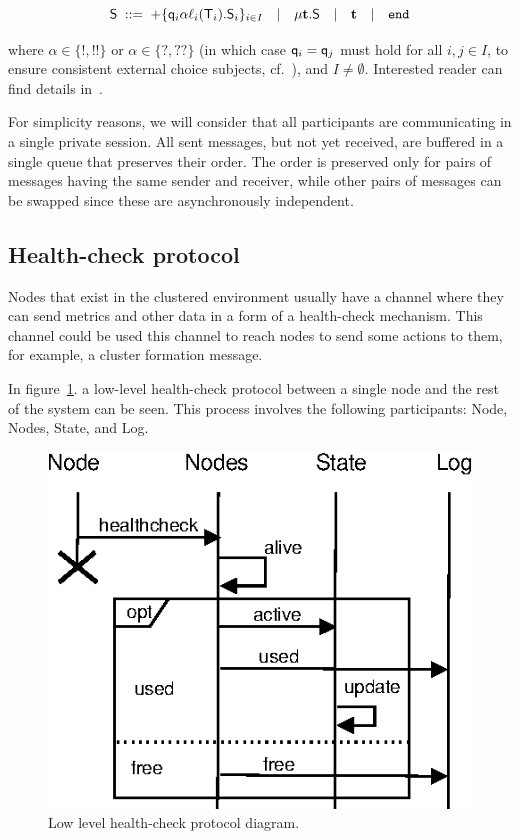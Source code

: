 \begin{enumerate}[start=1,label={(\bfseries \arabic*)}]
	\begin{equation}
	{\mathsf S} \; ::= \; 
	{+}\{{\sf q}_i\alpha\ell_i({\mathsf T}_i).{\mathsf S}_i\}_{i\in I}  \quad | \quad 
	\mu \textbf{t}.{\mathsf S} \quad | \quad 
	\textbf{t} \quad | \quad
	\mathtt{end}
	\end{equation}
	
	\noindent
	where $\alpha\in\{{!}, {!!}\}$ or  $\alpha\in\{{?}, {??}\}$ (in which case ${\sf q}_i={\sf q}_j$ must hold for all $i,j \in I$, to ensure consistent external choice subjects, cf.~\cite[Page 6.]{HuY17}), and $I\not=\emptyset$.
	Interested reader can find details in~\cite{HuY17}.
\end{enumerate}

\noindent
For simplicity reasons, we will consider that all participants are communicating in a single private session. All sent messages, but not yet received, are buffered in a single queue that preserves their order. The order is preserved only for pairs of messages having the same sender and receiver, while other pairs of messages can be swapped since these are asynchronously independent.
%
%
\subsection{Health-check protocol}\label{sec:health_check_protocol}
%
Nodes that exist in the clustered environment usually have a channel where they can send metrics and other data in a form of a health-check mechanism. This channel could be used this channel to reach nodes to send some actions to them, for example, a cluster formation message. 

In figure~\ref{fig:fig6}. a low-level health-check protocol between a single node and the rest of the system can be seen. This process involves the following participants: Node, Nodes, State, and Log.

\begin{figure}[H]
	\begin{center}
		\includegraphics[scale=0.75]{images/FIG2}
	\end{center}
	\vspace{-0.7cm}
	\caption{Low level health-check protocol diagram.}
	\label{fig:fig6}
\end{figure} 

